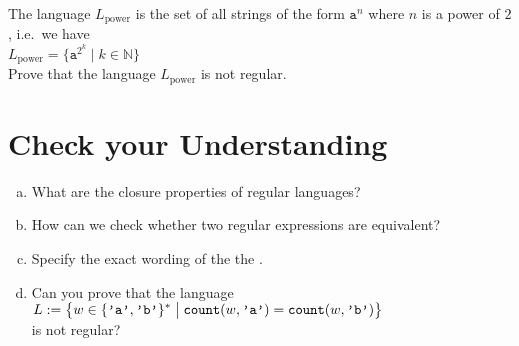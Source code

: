 \exerciseEng
The language $L_{\mathrm{power}}$ is the set of all strings of the form $\mathtt{a}^n$ where $n$ is a power of
$2$, i.e.~we have
\\[0.2cm]
\hspace*{1.3cm}
$L_{\mathrm{power}} = \bigl\{ \mathtt{a}^{2^k} \mid k \in \mathbb{N} \bigr\}$
\\[0.2cm]
Prove that the language $L_{\mathrm{power}}$ is not regular.
\eox

\section{Check your Understanding}
\begin{enumerate}[(a)]
\item What are the closure properties of regular languages?
\item How can we check whether two regular expressions are equivalent?
\item Specify the exact wording of the the .
\item Can you prove that the language
      \\[0.2cm]
      \hspace*{1.3cm}
      $\displaystyle L := \bigl\{ w \in \{\texttt{'a'}, \texttt{'b'}\}^* \bigm| \texttt{count}(w, \texttt{'a'})=\texttt{count}(w, \texttt{'b'}) \bigr\}$
      \\[0.2cm]
      is not regular?
\end{enumerate}


